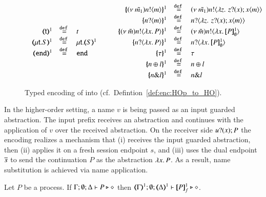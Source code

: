 \begin{figure}[h!]
\[\begin{array}{c}
\begin{array}{rcl}
			\tmap{\vart{t}}{1} &\defeq& {t}
			\\
			\tmap{\trec{t}{S}}{1} &\defeq& \trec{t}{\tmap{S}{1}}
			\\
			\tmap{\tinact}{1} &\defeq& \tinact
		\end{array}
		\qquad
		\begin{array}{rcl}
			\mapa{\news{\tilde{m_1}}\bactout{n}{m}}^{1} &\defeq&   \news{\tilde{m_1}}\bactout{n}{\abs{z}{\,\binp{z}{x} \appl{x}{m}} }
			\\
			\mapa{\bactinp{n}{m}}^{1} &\defeq&   \bactinp{n}{\abs{z}{\,\binp{z}{x} \appl{x}{m}} }
			\\

			\mapa{\news{\tilde{m}}\bactout{n}{\abs{x}{P}}}^{1} &\defeq& \news{\tilde{m}}\bactout{n}{\abs{x}{\pmapp{P}{1}{\es}}}
			\\
			\mapa{\bactinp{n}{\abs{x}{P}}}^{1} &\defeq& \bactinp{n}{\abs{x}{\pmapp{P}{1}{\es}}}
			\\
			\mapa{\tau}^{1} &\defeq& \tau
			\\
			\mapa{\bactsel{n}{l} }^{1} &\defeq& \bactsel{n}{l} 
			\\
			\mapa{\bactbra{n}{l} }^{1} &\defeq& \bactbra{n}{l} 
		\end{array}
	\end{array}
\]
	\caption{
		\label{fig:enc:HOp_to_HO}
		Typed encoding of \HOp into \HO (cf.~Defintion~\ref{def:enc:HOp_to_HO}).
	}
\end{figure}



In the higher-order setting, a name $v$ is being passed as an input
guarded abstraction. The input prefix receives an abstraction and
continues with the application of $v$ over the received abstraction.
On the receiver side $u ? (x) ; P$ 
the encoding realizes a mechanism that (i) receives
the input guarded abstraction, then (ii) applies it on a fresh session endpoint $s$, 
and (iii) uses
the dual endpoint $\overline{s}$ to send the continuation $P$ as the abstraction
$\lambda x.\,P$. 
As a result, name substitution is achieved via name application.


\begin{proposition}
	\label{prop:typepres_HOp_to_HO}
	Let $P$ be a \HOp process.
	If $\Gamma; \emptyset; \Delta \vdash P \triangleright \diamond$ then 
	$\mapt{\Gamma}^{1}; \emptyset; \mapt{\Delta}^{1} \proves \pmapp{P}{1}{f} \hastype \Proc$. 
\end{proposition}

